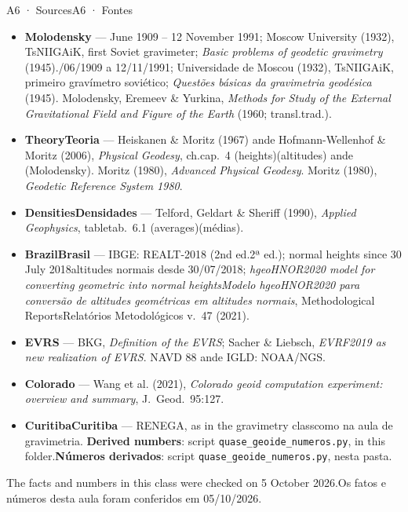 \documentclass[aspectratio=169,11pt]{beamer}
\newcommand{\tr}[2]{\ifEN#2\else#1\fi}
\begin{document}
\begin{frame}{\tr{A6 · Fontes}{A6 · Sources}}
  \scriptsize
  \begin{itemize}
    \setlength{\itemsep}{0pt}
    \item \textbf{Molodensky} --- \tr{16/06/1909 a 12/11/1991; Universidade de Moscou (1932),
          TsNIIGAiK, primeiro gravímetro soviético; \emph{Questões básicas da gravimetria
          geodésica} (1945).}{16 June 1909 -- 12 November 1991; Moscow University (1932),
          TsNIIGAiK, first Soviet gravimeter; \emph{Basic problems of geodetic gravimetry}
          (1945).} Molodensky, Eremeev \& Yurkina, \emph{Methods for Study of the External
          Gravitational Field and Figure of the Earth} (1960; \tr{trad.}{transl.} 1962).
    \item \tr{\textbf{Teoria}}{\textbf{Theory}} --- Heiskanen \& Moritz (1967) \tr{e}{and}
          Hofmann-Wellenhof \& Moritz (2006), \emph{Physical Geodesy}, \tr{cap.}{ch.}~4
          \tr{(altitudes)}{(heights)} \tr{e}{and} 8 (Molodensky). Moritz (1980), \emph{Advanced
          Physical Geodesy}. Moritz (1980), \emph{Geodetic Reference System 1980}.
    \item \tr{\textbf{Densidades}}{\textbf{Densities}} --- Telford, Geldart \& Sheriff (1990),
          \emph{Applied Geophysics}, \tr{tab.}{table}~6.1 \tr{(médias)}{(averages)}.
    \item \textbf{\tr{Brasil}{Brazil}} --- IBGE: REALT-2018 (\tr{2ª ed.}{2nd ed.} 2019);
          \tr{altitudes normais desde 30/07/2018}{normal heights since 30 July 2018};
          \emph{\tr{Modelo hgeoHNOR2020 para conversão de altitudes geométricas em altitudes
          normais}{hgeoHNOR2020 model for converting geometric into normal heights}},
          \tr{Relatórios Metodológicos}{Methodological Reports} v.~47 (2021).
    \item \textbf{EVRS} --- BKG, \emph{Definition of the EVRS}; Sacher \& Liebsch,
          \emph{EVRF2019 as new realization of EVRS}. NAVD 88 \tr{e}{and} IGLD: NOAA/NGS.
    \item \textbf{Colorado} --- Wang et al. (2021), \emph{Colorado geoid computation
          experiment: overview and summary}, J.~Geod.~95:127.
    \item \tr{\textbf{Curitiba}}{\textbf{Curitiba}} --- RENEGA, \tr{como na aula de
          gravimetria}{as in the gravimetry class}. \tr{\textbf{Números derivados}: script
          \texttt{quase\_geoide\_numeros.py}, nesta pasta.}{\textbf{Derived numbers}: script
          \texttt{quase\_geoide\_numeros.py}, in this folder.}
  \end{itemize}
  \smallskip
  \centering
  \footnotesize \tr{Os fatos e números desta aula foram conferidos em 05/10/2026.}{The facts
  and numbers in this class were checked on 5 October 2026.}
\end{frame}
\end{document}
